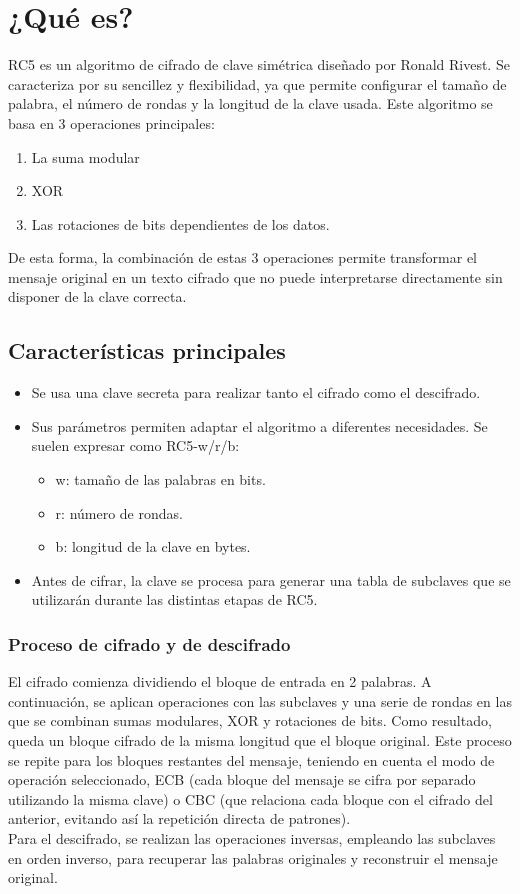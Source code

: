 \documentclass[12pt,a4paper]{article}
\begin{document}
	\section{¿Qué es?}
	RC5 es un algoritmo de cifrado de clave simétrica diseñado por Ronald Rivest. Se caracteriza por su sencillez y flexibilidad, ya que permite configurar el tamaño de palabra, el número de rondas y la longitud de la clave usada.
	Este algoritmo se basa en 3 operaciones principales:
	\begin{enumerate}
		\item La suma modular
		\item XOR
		\item Las rotaciones de bits dependientes de los datos.
	\end{enumerate}
	De esta forma, la combinación de estas 3 operaciones permite transformar el mensaje original en un texto cifrado que no puede interpretarse directamente sin disponer de la clave correcta.
	\subsection{Características principales}
	\begin{itemize}
		\item Se usa una clave secreta para realizar tanto el cifrado como el descifrado.
		\item Sus parámetros permiten adaptar el algoritmo a diferentes necesidades. Se suelen expresar como RC5-w/r/b: 
		\begin{itemize}
			\item w: tamaño de las palabras en bits.
			\item r: número de rondas.
			\item b: longitud de la clave en bytes.
		\end{itemize}
		\item Antes de cifrar, la clave se procesa para generar una tabla de subclaves que se utilizarán durante las distintas etapas de RC5.
	\end{itemize}

	\subsubsection{Proceso de cifrado y de descifrado}
	El cifrado comienza dividiendo el bloque de entrada en 2 palabras. A continuación, se aplican operaciones con las subclaves y una serie de rondas en las que se combinan sumas modulares, XOR y rotaciones de bits. Como resultado, queda un bloque cifrado de la misma longitud que el bloque original. Este proceso se repite para los bloques restantes del mensaje, teniendo en cuenta el modo de operación seleccionado, ECB (cada bloque del mensaje se cifra por separado utilizando la misma clave) o CBC (que relaciona cada bloque con el cifrado del anterior, evitando así la repetición directa de patrones).\\
	Para el descifrado, se realizan las operaciones inversas, empleando las subclaves en orden inverso, para recuperar las palabras originales y reconstruir el mensaje original.
	
\end{document}
